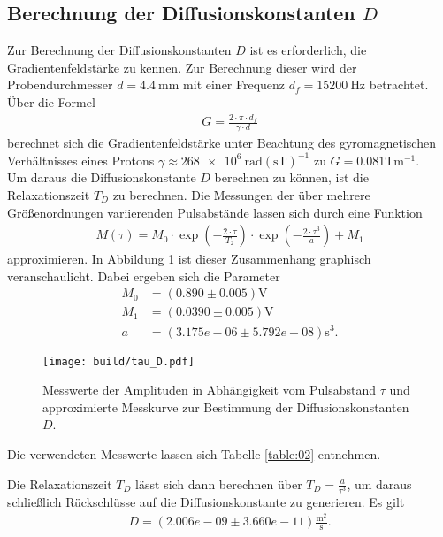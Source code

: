\subsection{Berechnung der Diffusionskonstanten $D$}
\noindent Zur Berechnung der Diffusionskonstanten $D$ ist es erforderlich, die
Gradientenfeldstärke zu kennen. Zur Berechnung dieser wird der Probendurchmesser
$d = \SI{4.4}{\milli\meter}$ mit einer Frequenz $d_f = \SI{15200}{\hertz}$
betrachtet. Über die Formel
\begin{align}
  G = \frac{2 \cdot \pi \cdot d_f}{\gamma \cdot d}
  \label{eqn:05}
\end{align}
\noindent berechnet sich die Gradientenfeldstärke unter Beachtung des
gyromagnetischen Verhältnisses eines Protons $\gamma \approx \num{268e6} \:
\text{rad}(\si{\second\tesla})^{-1}$ zu
$G = \num{0.081} {\si{\tesla}}{\si{\meter}^{-1}}$. \\
\noindent Um daraus die Diffusionskonstante $D$ berechnen zu können, ist die
Relaxationszeit $T_D$ zu berechnen. Die Messungen der über mehrere
Größenordnungen variierenden Pulsabstände lassen sich durch eine Funktion
\begin{align}
  M(\tau) = M_0 \cdot \exp{\left(- \frac{2 \cdot \tau}{T_2}\right)} \cdot \exp{\left(- \frac{2 \cdot \tau^3}{a}\right)} + M_1
 \label{eqn:06}
\end{align}
\noindent approximieren. In Abbildung \ref{fig:03} ist dieser Zusammenhang
graphisch veranschaulicht. Dabei ergeben sich die Parameter
\begin{align*}
  M_0 &=  (0.890  \pm  0.005)          \si{\volt} \\
  M_1 &=  (0.0390  \pm  0.005)         \si{\volt} \\
  a &=  (3.175e-06  \pm  5.792e-08) \si{\second^3}.
\end{align*}
\FloatBarrier
\begin{figure}
  \texttt{[image: build/tau\_D.pdf]}
  \caption{Messwerte der Amplituden in Abhängigkeit vom Pulsabstand $\tau$ und
  approximierte Messkurve zur Bestimmung der Diffusionskonstanten $D$.}
  \label{fig:03}
\end{figure}
\FloatBarrier
\noindent Die verwendeten Messwerte lassen sich Tabelle \ref{table:02} entnehmen.
\FloatBarrier

\FloatBarrier
\noindent Die Relaxationszeit $T_D$ lässt sich dann berechnen über
$T_D = \frac{a}{\tau^3}$, um daraus schließlich Rückschlüsse auf die
Diffusionskonstante zu generieren. Es gilt
\begin{align*}
  D = (2.006e-09 \pm 3.660e-11) \frac{\si{\meter^2}}{\si{\second}}.
\end{align*}
